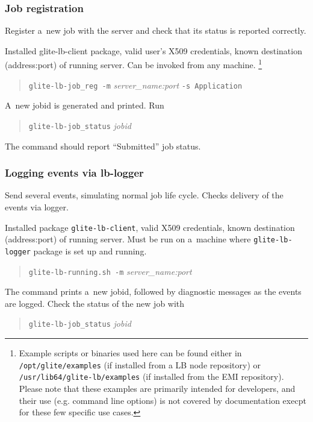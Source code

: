 \subsubsection{Job registration}

Register a~new job with the \LB server and check that its status is
reported correctly.

\req Installed glite-lb-client package, valid user's X509 credentials,
known destination (address:port) of running \LB server.
Can be invoked from any machine.
\footnote{Example scripts or binaries used here can be found either
in \texttt{/opt/glite/examples} (if installed from a LB node repository) or
\texttt{/usr/lib64/glite-lb/examples} (if installed from the EMI repository). Please note that these examples are primarily intended for developers, and their use (e.g. command line options) is not covered by documentation execpt for these few specific use cases.}\setcounter{examplesfootnote}{\thefootnote}

\how 
\begin{quote}
\texttt{glite-lb-job\_reg -m} \emph{server\_name:port} \texttt{-s Application}
\end{quote}
A~new jobid is generated and printed.  Run 
\begin{quote}
\verb'glite-lb-job_status' \emph{jobid}
\end{quote}

\result
The command should report ``Submitted'' job status.

\subsubsection{Logging events via lb-logger}

\label{smoke-log}

Send several \LB events, simulating normal job life cycle.
Checks delivery of the events via \LB logger.

\req Installed package \texttt{glite-lb-client}, valid X509 credentials,
known destination (address:port) of running \LB server.
Must be run on a~machine where \texttt{glite-lb-logger} package is set up and running.\footnotemark[\theexamplesfootnote]

\how
\begin{quote}
\texttt{glite-lb-running.sh -m} \emph{server\_name:port}
\end{quote}

The command prints a~new jobid, followed by diagnostic messages as the events are logged. 
Check the status of the new job with
\begin{quote}
\verb'glite-lb-job_status' \emph{jobid}
\end{quote}

